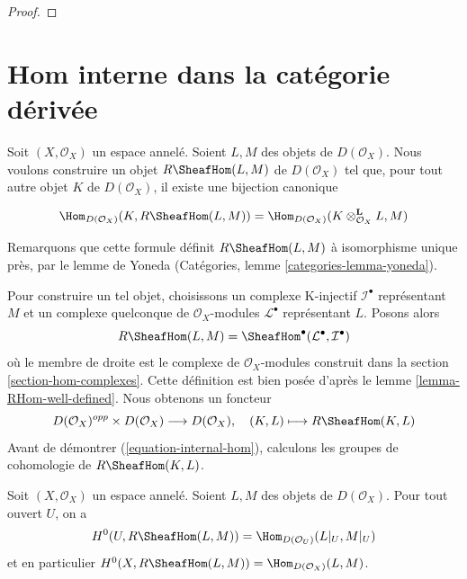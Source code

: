 {\begin{proof}
\end{proof}







\section{Hom interne dans la catégorie dérivée}

\label{section-internal-hom}

\noindent

Soit $(X, \mathcal{O}_X)$ un espace annelé. Soient $L, M$ des objets de $D(\mathcal{O}_X)$. Nous voulons construire un objet
$R\SheafHom(L, M)$ de $D(\mathcal{O}_X)$ tel que, pour tout autre objet $K$ de $D(\mathcal{O}_X)$, il existe une bijection canonique

\begin{equation}
\label{equation-internal-hom}
\Hom_{D(\mathcal{O}_X)}(K, R\SheafHom(L, M))
=
\Hom_{D(\mathcal{O}_X)}(K \otimes_{\mathcal{O}_X}^\mathbf{L} L, M)
\end{equation}

Remarquons que cette formule définit $R\SheafHom(L, M)$ à isomorphisme unique près, par le lemme de Yoneda (Catégories, lemme \ref{categories-lemma-yoneda}).

\medskip\noindent
Pour construire un tel objet, choisissons un complexe K-injectif $\mathcal{I}^\bullet$ représentant $M$ et un complexe quelconque de $\mathcal{O}_X$-modules $\mathcal{L}^\bullet$ représentant $L$. Posons alors $$
R\SheafHom(L, M) = \SheafHom^\bullet(\mathcal{L}^\bullet, \mathcal{I}^\bullet)
$$ où le membre de droite est le complexe de $\mathcal{O}_X$-modules construit dans la section \ref{section-hom-complexes}. Cette définition est bien posée d'après le lemme \ref{lemma-RHom-well-defined}. Nous obtenons un foncteur $$
D(\mathcal{O}_X)^{opp} \times D(\mathcal{O}_X) \longrightarrow D(\mathcal{O}_X),
\quad
(K, L) \longmapsto R\SheafHom(K, L)
$$ Avant de démontrer (\ref{equation-internal-hom}), calculons les groupes de cohomologie de $R\SheafHom(K, L)$.

\begin{lemma}

\label{lemma-section-RHom-over-U}
Soit $(X, \mathcal{O}_X)$ un espace annelé. Soient $L, M$ des objets de $D(\mathcal{O}_X)$. Pour tout ouvert $U$, on a $$
H^0(U, R\SheafHom(L, M)) =
\Hom_{D(\mathcal{O}_U)}(L|_U, M|_U)
$$ et en particulier $H^0(X, R\SheafHom(L, M)) = \Hom_{D(\mathcal{O}_X)}(L, M)$.
\end{lemma}

}
